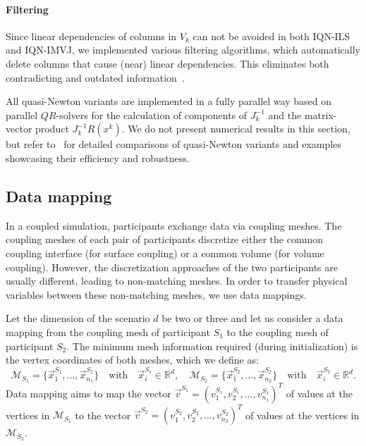 \paragraph{Filtering} Since linear dependencies of columns in $V_k$ can not be avoided in both IQN-ILS and IQN-IMVJ, we implemented various filtering algorithms, which automatically delete columns that cause (near) linear dependencies. This eliminates both contradicting and outdated information~\cite{Haelterman2015_Filtering}.

All quasi-Newton variants are implemented in a fully parallel way based on parallel $QR$-solvers for the calculation of components of $J_k^{-1}$ and the matrix-vector product $J_k^{-1} R(x^k)$. We do not present numerical results in this section, but refer to~\cite{Mehl2016, Scheuf:QN,Uekermann2016} for detailed comparisons of quasi-Newton variants and examples showcasing their efficiency and robustness. 

\subsection{Data mapping} 
\label{ssec:mapping}

In a coupled simulation, participants exchange data via coupling meshes. 
The coupling meshes of each pair of participants discretize either the common coupling interface (for surface coupling) or a common volume (for volume coupling).
However, the discretization approaches of the two participants are usually different, leading to non-matching meshes.
In order to transfer physical variables between these non-matching meshes, we use data mappings.


Let the dimension of the scenario $d$ be two or three and let us consider a data mapping from the coupling mesh of participant $S_1$ to the coupling mesh of participant $S_2$. 
The minimum mesh information required (during initialization) is the vertex coordinates of both meshes, which we define as:
\[
\mathcal{M}_{S_1} = \lbrace \vec{x}_{1}^{S_1}, \ldots, \vec{x}_{n_{1}}^{S_1} \rbrace \quad \mbox{with} \quad \vec{x}_{i}^{S_1} \in \mathbb{R}^{d}, \quad 
\mathcal{M}_{S_2} = \lbrace \vec{x}_{1}^{S_2}, \ldots, \vec{x}_{n_2}^{S_2} \rbrace \quad \mbox{with} \quad \vec{x}_{i}^{S_2} \in \mathbb{R}^{d}.
\]
Data mapping aims to map the vector $\vec{v}^{S_1} = (v_1^{S_1}, v_2^{S_1}, \ldots, v_{n_1}^{S_1})^T$ of values at the vertices in $\mathcal{M}_{S_1}$ to the vector $\vec{v}^{S_2} = ( v_1^{S_2}, v_2^{S_2}, \ldots, v_{n_2}^{S_2})^T$ of values at the vertices in $\mathcal{M}_{S_2}$. 

